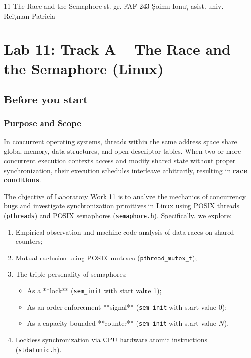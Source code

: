 \documentclass{labreport}
\begin{document}
\labtitle
    {11}
    {The Race and the Semaphore}
    {st. gr. FAF-243}
    {Șoimu Ionuț}
    {asist. univ.\\[0.15cm] Reițman Patricia}

\tableofcontents
\newpage

\section{Lab 11: Track A -- The Race and the Semaphore (Linux)}

\subsection{Before you start}

\subsubsection*{Purpose and Scope}
In concurrent operating systems, threads within the same address space share global memory, data structures, and open descriptor tables. When two or more concurrent execution contexts access and modify shared state without proper synchronization, their execution schedules interleave arbitrarily, resulting in \textbf{race conditions}.

The objective of Laboratory Work 11 is to analyze the mechanics of concurrency bugs and investigate synchronization primitives in Linux using POSIX threads (\texttt{pthreads}) and POSIX semaphores (\texttt{semaphore.h}). Specifically, we explore:
\begin{enumerate}[label=(\alph*), noitemsep]
    \item Empirical observation and machine-code analysis of data races on shared counters;
    \item Mutual exclusion using POSIX mutexes (\texttt{pthread\_mutex\_t});
    \item The triple personality of semaphores:
    \begin{itemize}[noitemsep]
        \item As a **lock** (\texttt{sem\_init} with start value 1);
        \item As an order-enforcement **signal** (\texttt{sem\_init} with start value 0);
        \item As a capacity-bounded **counter** (\texttt{sem\_init} with start value $N$).
    \end{itemize}
    \item Lockless synchronization via CPU hardware atomic instructions (\texttt{stdatomic.h}).
\end{enumerate}
\end{document}
